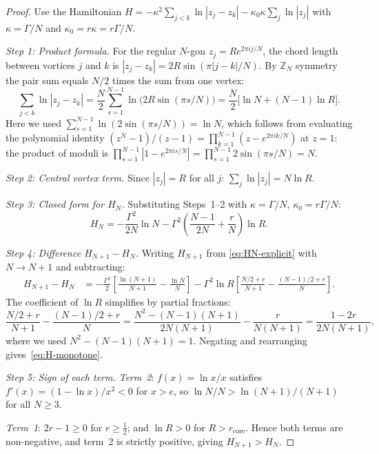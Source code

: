 \begin{proof}
Use the Hamiltonian
$H = -\kappa^2\!\sum_{j<k}\ln|z_j - z_k| - \kappa_0\kappa\!\sum_j\ln|z_j|$
with $\kappa = \Gamma/N$ and $\kappa_0 = r\kappa = r\Gamma/N$.

\emph{Step 1: Product formula.}
For the regular $N$-gon $z_j = Re^{2\pi ij/N}$, the chord length
between vortices $j$ and $k$ is $|z_j - z_k| = 2R\sin(\pi|j-k|/N)$.
By $\mathbb{Z}_N$ symmetry the pair sum equals $N/2$ times the sum from
one vertex:
\[
  \sum_{j<k}\ln|z_j - z_k|
  = \frac{N}{2}\sum_{s=1}^{N-1}\ln\!\bigl(2R\sin(\pi s/N)\bigr)
  = \frac{N}{2}\bigl[\ln N + (N-1)\ln R\bigr].
\]
Here we used $\sum_{s=1}^{N-1}\ln(2\sin(\pi s/N)) = \ln N$, which
follows from evaluating the polynomial identity $(z^N-1)/(z-1) =
\prod_{k=1}^{N-1}(z - e^{2\pi ik/N})$ at $z = 1$: the product of
moduli is $\prod_{s=1}^{N-1}|1 - e^{2\pi is/N}|
= \prod_{s=1}^{N-1}2\sin(\pi s/N) = N$.

\emph{Step 2: Central vortex term.}
Since $|z_j| = R$ for all $j$: $\sum_j\ln|z_j| = N\ln R$.

\emph{Step 3: Closed form for $H_N$.}
Substituting Steps~1--2 with $\kappa = \Gamma/N$, $\kappa_0 = r\Gamma/N$:
\begin{equation}\label{eq:HN-explicit}
  H_N = -\frac{\Gamma^2}{2N}\ln N
        - \Gamma^2\!\left(\frac{N-1}{2N} + \frac{r}{N}\right)\ln R.
\end{equation}

\emph{Step 4: Difference $H_{N+1} - H_N$.}
Writing $H_{N+1}$ from \eqref{eq:HN-explicit} with $N\to N+1$ and
subtracting:
\begin{align*}
  H_{N+1} - H_N
  &= -\frac{\Gamma^2}{2}\!\left[\frac{\ln(N{+}1)}{N{+}1}
     - \frac{\ln N}{N}\right]
     - \Gamma^2\ln R\!\left[\frac{N/2+r}{N{+}1}
     - \frac{(N{-}1)/2+r}{N}\right].
\end{align*}
The coefficient of $\ln R$ simplifies by partial fractions:
\[
  \frac{N/2+r}{N{+}1} - \frac{(N{-}1)/2+r}{N}
  = \frac{N^2 - (N{-}1)(N{+}1)}{2N(N{+}1)} - \frac{r}{N(N{+}1)}
  = \frac{1-2r}{2N(N{+}1)},
\]
where we used $N^2-(N-1)(N+1) = 1$.  Negating and rearranging
gives~\eqref{eq:H-monotone}.

\emph{Step 5: Sign of each term.}
\emph{Term~2}: $f(x) = \ln x/x$ satisfies $f'(x) = (1-\ln x)/x^2 < 0$
for $x > e$, so $\ln N/N > \ln(N+1)/(N+1)$ for all $N \ge 3$.

\emph{Term~1}: $2r-1 \ge 0$ for $r \ge \tfrac{1}{2}$; and
$\ln R > 0$ for $R > r_{\mathrm{core}}$.  Hence both terms are
non-negative, and term~2 is strictly positive, giving
$H_{N+1} > H_N$.
\end{proof}

